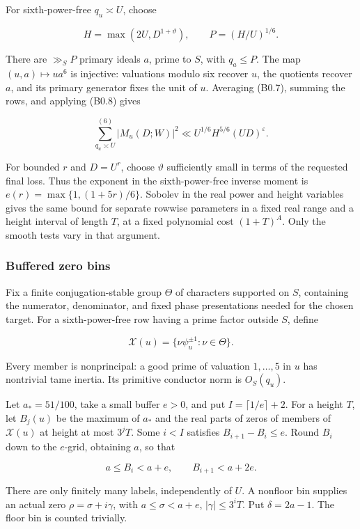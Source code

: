 \documentclass[11pt,a4paper]{article}
\begin{document}
For sixth-power-free \(q_u\asymp U\), choose

\[
H=\max(2U,D^{1+\vartheta}),\qquad P=(H/U)^{1/6}.
\]

There are \(\gg_S P\) primary ideals \(a\), prime to \(S\), with
\(q_a\le P\). The map \((u,\allowbreak{}a)\mapsto ua^6\) is injective: valuations
modulo six recover \(u\), the quotients recover \(a\), and its primary
generator fixes the unit of \(u\). Averaging (B0.7), summing the rows,
and applying (B0.8) gives

\[
\sum_{q_u\asymp U}^{(6)}|M_u(D;W)|^2
\ll U^{1/6}H^{5/6}(UD)^\varepsilon.
\tag{B0.9}
\]

For bounded \(r\) and \(D=U^r\), choose \(\vartheta\) sufficiently small
in terms of the requested final loss. Thus the exponent in the
sixth-power-free inverse moment is \(e(r)=\max\{1,\allowbreak{}(1+5r)/6\}\). Sobolev
in the real power and height variables gives the same bound for separate
rowwise parameters in a fixed real range and a height interval of length
\(T\), at a fixed polynomial cost \((1+T)^A\). Only the smooth tests
vary in that argument.

\hypertarget{buffered-zero-bins}{%
\subsubsection{Buffered zero bins}\label{buffered-zero-bins}}

Fix a finite conjugation-stable group \(\Theta\) of characters supported
on \(S\), containing the numerator, denominator, and fixed phase
presentations needed for the chosen target. For a sixth-power-free row
having a prime factor outside \(S\), define

\[
\mathcal X(u)=\{\nu\psi_u^{\pm1}:\nu\in\Theta\}.
\]

Every member is nonprincipal: a good prime of valuation \(1,\allowbreak{}\ldots,\allowbreak{}5\)
in \(u\) has nontrivial tame inertia. Its primitive conductor norm is
\(O_S(q_u)\).

Let \(a_*=51/100\), take a small buffer \(e>0\), and put
\(I=\lceil1/e\rceil+2\). For a height \(T\), let \(B_j(u)\) be the
maximum of \(a_*\) and the real parts of zeros of members of
\(\mathcal X(u)\) at height at most \(3^jT\). Some \(i<I\) satisfies
\(B_{i+1}-B_i\le e\). Round \(B_i\) down to the \(e\)-grid, obtaining
\(a\), so that

\[
a\le B_i<a+e,\qquad B_{i+1}<a+2e.
\tag{B0.13}
\]

There are only finitely many labels, independently of \(U\). A nonfloor
bin supplies an actual zero \(\rho=\sigma+i\gamma\), with
\(a\le\sigma<a+e\), \(|\gamma|\le3^iT\). Put \(\delta=2a-1\). The floor
bin is counted trivially.
\end{document}
